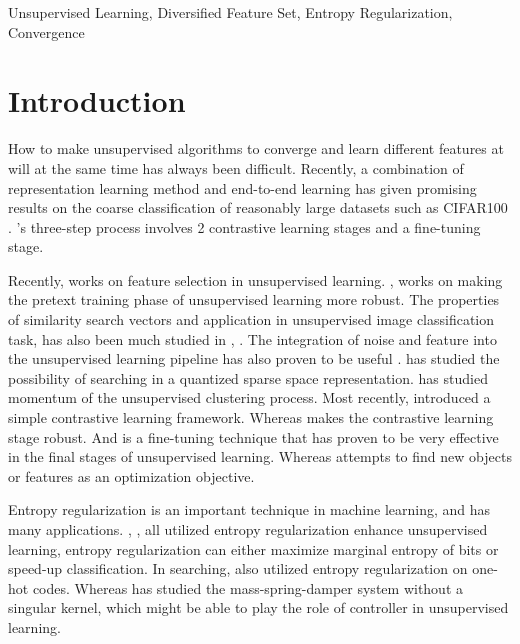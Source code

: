 \documentclass[10pt,twocolumn,letterpaper]{article}
\begin{document}
\begin{IEEEkeywords}
Unsupervised Learning, Diversified Feature Set, Entropy Regularization, Convergence

\end{IEEEkeywords}






\IEEEpeerreviewmaketitle



\section{Introduction}

How to make unsupervised algorithms to converge and learn different features at will at the same time has always been difficult. Recently, a combination of representation learning method and end-to-end learning  has given promising results on the coarse classification of reasonably large datasets such as CIFAR100 \cite{wvangansbeke2020scan}. \cite{wvangansbeke2020scan}'s three-step process involves 2 contrastive learning stages  and a fine-tuning stage.  

Recently, \cite{JunGuo_AAAI_2020} works on feature selection in unsupervised learning. \cite{pretextInvariant2020}, \cite{pretrain2019Uncurated} works on making the pretext training phase of unsupervised learning more robust. 
The properties of similarity search vectors and application in unsupervised image classification task, has also been much studied in  \cite{alex2018spreading}, \cite{spreadLocal2019} . The integration of noise and feature into the unsupervised learning pipeline has also proven to be useful \cite{bojanowski2017unsupervised}. \cite{jain2016approximate} \cite{Zhang2015SparseCQ} has studied the possibility of searching in a quantized sparse space representation. \cite{he2019momentum} has studied momentum of the unsupervised clustering process. Most recently, \cite{chen2020simple} introduced a simple contrastive learning framework. Whereas \cite{chuang2020debiased} makes the contrastive learning stage robust. And \cite{asano2020self} is a fine-tuning technique that has proven to be very effective in the final stages of unsupervised learning. Whereas \cite{vo2019unsupervised} attempts to find new objects or features as an optimization objective. 

Entropy regularization is an important technique in machine learning, and has many applications. \cite{pereyra2017regularizing}, \cite{cuturi2013sinkhorn}, \cite{Liong2015DeepHF} all utilized entropy regularization enhance unsupervised learning, entropy regularization can either maximize marginal entropy of bits or speed-up classification. In searching, \cite{subic2017} also utilized entropy regularization on one-hot codes.  Whereas \cite{entropy2015Spring} has studied the mass-spring-damper system without a singular kernel, which might be able to play the role of controller in unsupervised learning. 
\end{document}
